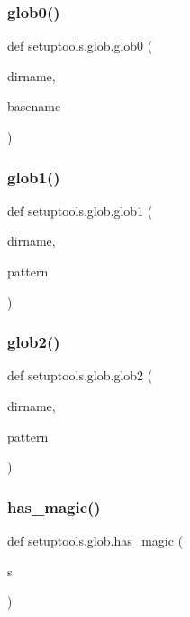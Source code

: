 \subsubsection{\texorpdfstring{glob0()}{glob0()}}
{\footnotesize\ttfamily def setuptools.\+glob.\+glob0 (\begin{DoxyParamCaption}\item[{}]{dirname,  }\item[{}]{basename }\end{DoxyParamCaption})}

\mbox{\label{namespacesetuptools_1_1glob_a44ead1132e5a984ad1edd86a4b643141}} 
\subsubsection{\texorpdfstring{glob1()}{glob1()}}
{\footnotesize\ttfamily def setuptools.\+glob.\+glob1 (\begin{DoxyParamCaption}\item[{}]{dirname,  }\item[{}]{pattern }\end{DoxyParamCaption})}

\mbox{\label{namespacesetuptools_1_1glob_a314c02b7732b13b3a0c129a7282b55ef}} 
\subsubsection{\texorpdfstring{glob2()}{glob2()}}
{\footnotesize\ttfamily def setuptools.\+glob.\+glob2 (\begin{DoxyParamCaption}\item[{}]{dirname,  }\item[{}]{pattern }\end{DoxyParamCaption})}

\mbox{\label{namespacesetuptools_1_1glob_aab80b9560e1118922c32b88a7b758288}} 
\subsubsection{\texorpdfstring{has\+\_\+magic()}{has\_magic()}}
{\footnotesize\ttfamily def setuptools.\+glob.\+has\+\_\+magic (\begin{DoxyParamCaption}\item[{}]{s }\end{DoxyParamCaption})}

